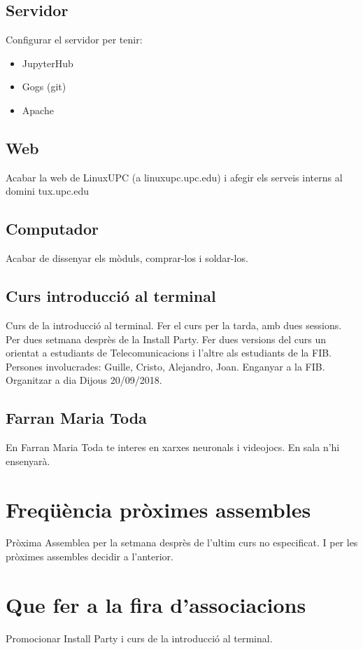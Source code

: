 \documentclass{article}
\begin{document}
\subsection{Servidor}
Configurar el servidor per tenir:
\begin{itemize}
    \item JupyterHub
    \item Gogs (git)
    \item Apache
\end{itemize}

\subsection{Web}
Acabar la web de LinuxUPC (a linuxupc.upc.edu) i afegir els serveis interns al domini tux.upc.edu

\subsection{Computador}
Acabar de dissenyar els mòduls, comprar-los i soldar-los.

\subsection{Curs introducció al terminal}
Curs de la introducció al terminal. Fer el curs per la tarda, amb dues sessions. Per dues setmana desprès de la Install Party. Fer dues versions del curs un orientat a estudiants de Telecomunicacions i l'altre als estudiants de la FIB. Persones involucrades: Guille, Cristo, Alejandro, Joan. Enganyar a la FIB. Organitzar a dia Dijous 20/09/2018.

\subsection{Farran Maria Toda}
En Farran Maria Toda te interes en xarxes neuronals i videojocs. En sala n'hi ensenyarà.

\section{Freqüència pròximes assembles}
Pròxima Assemblea per la setmana desprès de l'ultim curs no especificat. I per les pròximes assembles decidir a l'anterior.

\section{Que fer a la fira d'associacions}
Promocionar Install Party i curs de la introducció al terminal.
\end{document}
